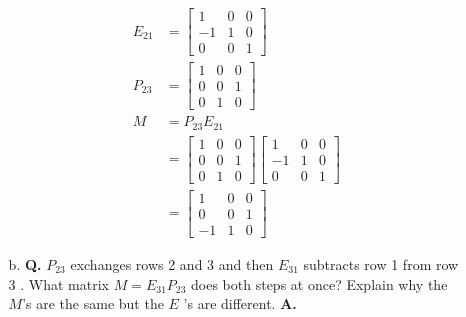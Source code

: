 \documentclass[main.tex]{subfiles}
\begin{document}
\begin{enumerate}
\begin{enumerate}
            $$
            \begin{aligned}
            E_{21} & = \left[\begin{array}{ccc}
            1 & 0 & 0 \\
            -1 & 1 & 0 \\
            0 & 0 & 1
            \end{array}\right] \\
            P_{23} & = \left[\begin{array}{lll}
            1 & 0 & 0 \\
            0 & 0 & 1 \\
            0 & 1 & 0
            \end{array}\right] \\
            M & =P_{23} E_{21} \\
            & =\left[\begin{array}{lll}
            1 & 0 & 0 \\
            0 & 0 & 1 \\
            0 & 1 & 0
            \end{array}\right]\left[\begin{array}{ccc}
            1 & 0 & 0 \\
            -1 & 1 & 0 \\
            0 & 0 & 1
            \end{array}\right] \\
            & =\left[\begin{array}{ccc}
            1 & 0 & 0 \\
            0 & 0 & 1 \\
            -1 & 1 & 0
            \end{array}\right]
            \end{aligned}
            $$
            
            \item [b.] \textbf{Q.}  $P_{23}$ exchanges rows 2 and 3 and then $E_{31}$ subtracts row 1 from row 3 . What matrix $M=E_{31} P_{23}$ does both steps at once? Explain why the $M$'s are the same but the $E$ 's are different. \textbf{A.}
            

\end{enumerate}
\end{enumerate}
\end{document}
